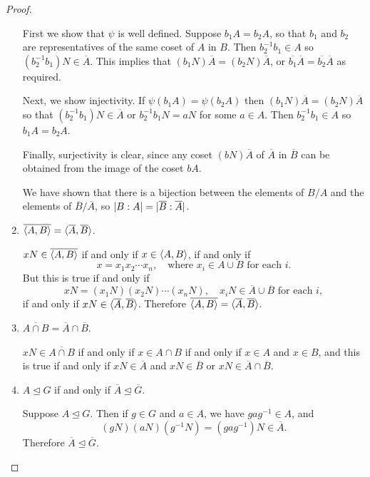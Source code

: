 \begin{proof}
\begin{enumerate}
    First we show that $\psi$ is well defined. Suppose $b_1A = b_2A$,
    so that $b_1$ and $b_2$ are representatives of the same coset of
    $A$ in $B$. Then $b_2^{-1}b_1\in A$ so
    $(b_2^{-1}b_1)N \in \overline{A}$. This implies that
    $(b_1N)\overline{A} = (b_2N)\overline{A}$, or
    $\overline{b_1}\overline{A} = \overline{b_2}\overline{A}$ as
    required.

    Next, we show injectivity. If $\psi(b_1A) = \psi(b_2A)$ then
    $(b_1N)\overline{A} = (b_2N)\overline{A}$ so that
    $(b_2^{-1}b_1)N\in\overline{A}$ or $b_2^{-1}b_1N = aN$ for some
    $a\in A$. Then $b_2^{-1}b_1\in A$ so $b_1A = b_2A$.

    Finally, surjectivity is clear, since any coset $(bN)\overline{A}$
    of $\overline{A}$ in $\overline{B}$ can be obtained from the image
    of the coset $bA$.

    We have shown that there is a bijection between the elements of
    $B/A$ and the elements of $\overline{B}/\overline{A}$, so
    $\lvert{B:A}\rvert = \lvert{\overline{B}:\overline{A}}\rvert$.
  \item $\overline{\langle{A, B}\rangle} = \langle{\overline{A}, \overline{B}}\rangle$.

    $xN\in\overline{\langle{A,B}\rangle}$ if and only if $x\in\langle{A,B}\rangle$, if and
    only if
    \begin{equation*}
      x = x_1x_2\cdots x_n,
      \quad\text{where $x_i\in A\cup B$ for each $i$}.
    \end{equation*}
    But this is true if and only if
    \begin{equation*}
      xN = (x_1N)(x_2N)\cdots(x_nN),
      \quad\text{$x_iN\in\overline{A}\cup\overline{B}$ for each $i$},
    \end{equation*}
    if and only if $xN\in\langle{\overline{A},\overline{B}}\rangle$. Therefore
    $\overline{\langle{A,B}\rangle} = \langle{\overline{A},\overline{B}}\rangle$.
  \item $\overline{A\cap B} = \overline{A}\cap\overline{B}$.

    $xN \in \overline{A\cap B}$ if and only if $x\in A\cap B$ if and
    only if $x\in A$ and $x\in B$, and this is true if and only if
    $xN\in\overline{A}$ and $xN\in\overline{B}$ or
    $xN\in\overline{A}\cap\overline{B}$.
  \item $A\trianglelefteq G$ if and only if
    $\overline{A}\trianglelefteq\overline{G}$.

    Suppose $A\trianglelefteq G$. Then if $g\in G$ and $a\in A$, we
    have $gag^{-1}\in A$, and
    \begin{equation*}
      (gN)(aN)(g^{-1}N)
      = (gag^{-1})N
      \in\overline{A}.
    \end{equation*}
    Therefore $\overline{A}\trianglelefteq\overline{G}$.


\end{enumerate}
\end{proof}
